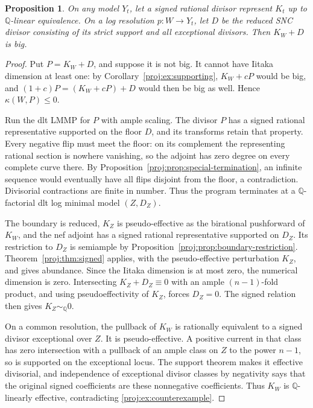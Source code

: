 \documentclass[11pt,letterpaper]{article}
\newcommand{\Q}{\mathbb{Q}}
\newtheorem{proposition}[theorem]{Proposition}
\theoremstyle{definition}
\theoremstyle{remark}
\begin{document}
\begin{proposition}\label{proj:prop:signed-alternative}
On any model \(Y_t\), let a signed rational divisor
represent \(K_t\) up to \(\Q\)-linear equivalence. On a
log resolution \(p:W\to Y_t\), let \(D\) be the reduced
SNC divisor consisting of its strict support and all
exceptional divisors. Then \(K_W+D\) is big.
\end{proposition}
\begin{proof}
Put \(P=K_W+D\), and suppose it is not big. It cannot
have Iitaka dimension at least one: by
Corollary~\ref{proj:ex:supporting}, \(K_W+cP\) would be big,
and
\((1+c)P=(K_W+cP)+D\) would then be big as well.
Hence \(\kappa(W,P)\leq0\).

Run the dlt LMMP for \(P\) with ample scaling.
The divisor \(P\) has a signed rational representative
supported on the floor \(D\), and its transforms retain
that property. Every negative flip must meet the floor:
on its complement the representing rational section is
nowhere vanishing, so the adjoint has zero degree on
every complete curve there. By
Proposition~\ref{proj:prop:special-termination}, an infinite
sequence would eventually have all flips disjoint from
the floor, a contradiction. Divisorial contractions
are finite in number. Thus the program terminates at
a \(\Q\)-factorial dlt log minimal model
\((Z,D_Z)\).

The boundary is reduced, \(K_Z\) is pseudo-effective
as the birational pushforward of \(K_W\), and the nef
adjoint has a signed rational representative supported
on \(D_Z\). Its restriction to \(D_Z\) is semiample
by Proposition~\ref{proj:prop:boundary-restriction}.
Theorem~\ref{proj:thm:signed} applies, with the
pseudo-effective perturbation \(K_Z\), and gives
abundance. Since the Iitaka dimension is at most zero,
the numerical dimension is zero. Intersecting
\(K_Z+D_Z\equiv0\) with an ample
\((n-1)\)-fold product, and using pseudoeffectivity of
\(K_Z\), forces \(D_Z=0\). The signed relation then
gives \(K_Z\sim_\Q0\).

On a common resolution, the pullback of \(K_W\) is
rationally equivalent to a signed divisor exceptional
over \(Z\). It is pseudo-effective. A positive current
in that class has zero intersection with a pullback
of an ample class on \(Z\) to the power \(n-1\),
so is supported on the exceptional locus. The support
theorem makes it effective divisorial, and independence
of exceptional divisor classes by negativity says that
the original signed coefficients are these nonnegative
coefficients. Thus \(K_W\) is \(\Q\)-linearly effective,
contradicting \eqref{proj:ex:counterexample}.
\end{proof}
\end{document}
